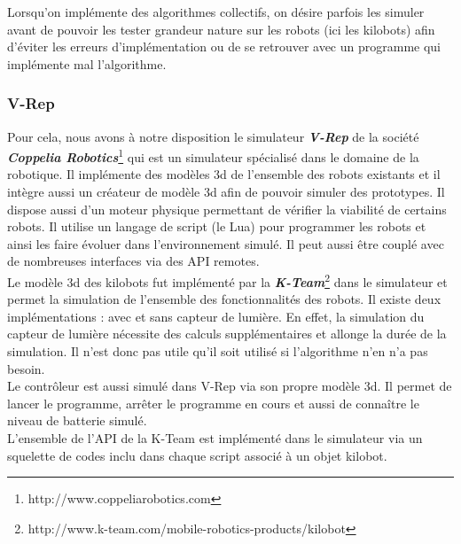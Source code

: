 \documentclass[a4paper,8pt]{report}
\begin{document}
Lorsqu'on impl\'emente des algorithmes collectifs, on d\'esire parfois les simuler avant de pouvoir les tester grandeur nature sur les robots (ici les kilobots) afin d'\'eviter les erreurs d'impl\'ementation ou de se retrouver avec un programme qui impl\'emente mal l'algorithme. \\

\subsubsection*{V-Rep}\label{subsubsec:name}

Pour cela, nous avons \`a notre disposition le simulateur \textit{\textbf{V-Rep}} de la soci\'et\'e \textit{\textbf{Coppelia Robotics}}\footnote{http://www.coppeliarobotics.com} qui est un simulateur sp\'ecialis\'e dans le domaine de la robotique. Il impl\'emente des mod\`eles 3d de l'ensemble des robots existants et il int\`egre aussi un cr\'eateur de mod\`ele 3d afin de pouvoir simuler des prototypes. Il dispose aussi d'un moteur physique permettant de v\'erifier la viabilit\'e de certains robots. Il utilise un langage de script (le Lua) pour programmer les robots et ainsi les faire \'evoluer dans l'environnement simul\'e. Il peut aussi \^etre coupl\'e avec de nombreuses interfaces via des API remotes.\\

\medskip
Le mod\`ele 3d des kilobots fut impl\'ement\'e par la \textit{\textbf{K-Team}}\footnote{http://www.k-team.com/mobile-robotics-products/kilobot} dans le simulateur et permet la simulation de l'ensemble des fonctionnalit\'es des robots. Il existe deux impl\'ementations : avec et sans capteur de lumi\`ere. En effet, la simulation du capteur de lumi\`ere n\'ecessite des calculs suppl\'ementaires et allonge la dur\'ee de la simulation. Il n'est donc pas utile qu'il soit utilis\'e si l'algorithme n'en n'a pas besoin. \\
Le contr\^oleur est aussi simul\'e dans V-Rep via son propre mod\`ele 3d. Il permet de lancer le programme, arr\^eter le programme en cours et aussi de conna\^itre le niveau de batterie simul\'e. \\
L'ensemble de l'API de la K-Team est impl\'ement\'e dans le simulateur via un squelette de codes inclu dans chaque script associ\'e \`a un objet kilobot.\\
\end{document}
